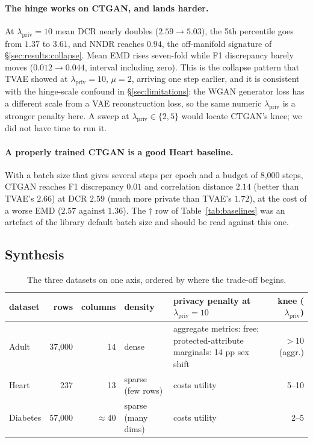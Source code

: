 \documentclass[11pt,a4paper]{article}
\newcommand{\lpriv}{\lambda_{\text{priv}}}
\begin{document}
\paragraph{The hinge works on CTGAN, and lands harder.} At $\lpriv = 10$ mean
DCR nearly doubles ($2.59 \to 5.03$), the 5th percentile goes from $1.37$ to
$3.61$, and NNDR reaches $0.94$, the off-manifold signature of
\S\ref{sec:results:collapse}. Mean EMD rises seven-fold while F1 discrepancy
barely moves ($0.012 \to 0.044$, interval including zero). This is the
collapse pattern that TVAE showed at $\lpriv = 10$, $\mu = 2$, arriving one
step earlier, and it is consistent with the hinge-scale confound in
\S\ref{sec:limitations}: the WGAN generator loss has a different scale from a
VAE reconstruction loss, so the same numeric $\lpriv$ is a stronger penalty
here. A sweep at $\lpriv \in \{2, 5\}$ would locate CTGAN's knee; we did not
have time to run it.

\paragraph{A properly trained CTGAN is a good Heart baseline.} With a batch
size that gives several steps per epoch and a budget of 8{,}000 steps, CTGAN
reaches F1 discrepancy $0.01$ and correlation distance $2.14$ (better than
TVAE's $2.66$) at DCR $2.59$ (much more private than TVAE's $1.72$), at the
cost of a worse EMD ($2.57$ against $1.36$). The $\dagger$ row of
Table~\ref{tab:baselines} was an artefact of the library default batch size
and should be read against this one.

\subsection{Synthesis}

\begin{table}[htbp]
\caption{The three datasets on one axis, ordered by where the trade-off
begins.}
\label{tab:synthesis}
\centering\small
\begin{tabularx}{\textwidth}{@{}l r r l Y r@{}}
\toprule
dataset & rows & columns & density & privacy penalty at $\lpriv = 10$ & knee ($\lpriv$) \\
\midrule
Adult    & 37{,}000 & 14        & dense              & aggregate metrics: free; protected-attribute marginals: 14 pp sex shift & $> 10$ (aggr.) \\
Heart    & 237    & 13          & sparse (few rows)  & costs utility & 5--10 \\
Diabetes & 57{,}000 & $\approx 40$ & sparse (many dims) & costs utility & 2--5 \\
\bottomrule
\end{tabularx}
\end{table}
\end{document}
